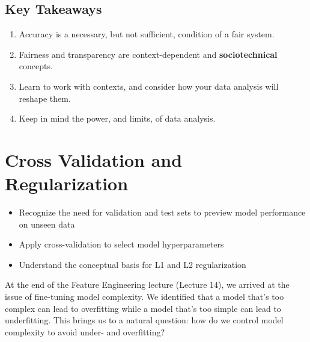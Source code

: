 \documentclass[
  letterpaper,
  DIV=11,
  numbers=noendperiod]{scrreprt}
\providecommand{\tightlist}{%
  \setlength{\itemsep}{0pt}\setlength{\parskip}{0pt}}\usepackage{longtable,booktabs,array}
\begin{document}
\section{Key Takeaways}\label{key-takeaways}

\begin{enumerate}
\def\labelenumi{\arabic{enumi}.}
\tightlist
\item
  Accuracy is a necessary, but not sufficient, condition of a fair
  system.
\item
  Fairness and transparency are context-dependent and
  \textbf{sociotechnical} concepts.
\item
  Learn to work with contexts, and consider how your data analysis will
  reshape them.
\item
  Keep in mind the power, and limits, of data analysis.
\end{enumerate}


\chapter{Cross Validation and
Regularization}\label{cross-validation-and-regularization}

\begin{tcolorbox}[enhanced jigsaw, arc=.35mm, colbacktitle=quarto-callout-note-color!10!white, coltitle=black, bottomrule=.15mm, leftrule=.75mm, bottomtitle=1mm, colback=white, toptitle=1mm, breakable, titlerule=0mm, rightrule=.15mm, colframe=quarto-callout-note-color-frame, opacitybacktitle=0.6, left=2mm, title=\textcolor{quarto-callout-note-color}{\faInfo}\hspace{0.5em}{Learning Outcomes}, toprule=.15mm, opacityback=0]

\begin{itemize}
\tightlist
\item
  Recognize the need for validation and test sets to preview model
  performance on unseen data
\item
  Apply cross-validation to select model hyperparameters
\item
  Understand the conceptual basis for L1 and L2 regularization
\end{itemize}

\end{tcolorbox}

At the end of the Feature Engineering lecture (Lecture 14), we arrived
at the issue of fine-tuning model complexity. We identified that a model
that's too complex can lead to overfitting while a model that's too
simple can lead to underfitting. This brings us to a natural question:
how do we control model complexity to avoid under- and overfitting?
\end{document}
